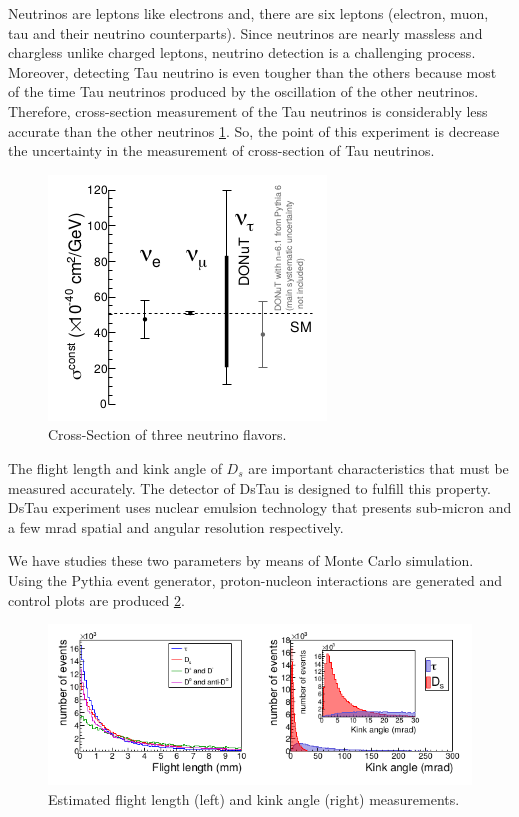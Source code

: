 \documentclass[12pt]{report}
\begin{document}
Neutrinos are leptons like electrons and, there are six leptons (electron, muon, tau and their neutrino counterparts). Since neutrinos are nearly massless and chargless unlike charged leptons, neutrino detection is a challenging process. Moreover, detecting Tau neutrino is even tougher than the others because most of the time Tau neutrinos produced by the oscillation of the other neutrinos. Therefore, cross-section measurement of the Tau neutrinos is considerably less accurate than the other neutrinos \ref{fig:cross}. So, the point of this experiment is decrease the uncertainty in the measurement of cross-section of Tau neutrinos.

\begin{figure}[htp]
\centering
\includegraphics[width = 6 cm]{LeptonCross.png}
\caption{Cross-Section of three neutrino flavors.~\cite[p.~2]{aoki_ariga_dmitrievsky_firu_forshaw_fukuda_gornushkin_guler_haiduc_2019}}
\label{fig:cross}
\end{figure}

The flight length and kink angle of $D_s$ are important characteristics that must be measured accurately. The detector of DsTau is designed to fulfill this property. DsTau experiment uses nuclear emulsion technology that presents sub-micron and a few mrad spatial and angular resolution respectively.

We have studies these two parameters by means of Monte Carlo simulation. Using the Pythia event generator, proton-nucleon interactions are generated and control plots are produced \ref{fig:result}.

\begin{figure}[htp]
\centering
\includegraphics[width = \linewidth]{pythiaOut.png}
\caption{Estimated flight length (left) and kink angle (right) measurements.~\cite[p.~5]{aoki_ariga_dmitrievsky_firu_forshaw_fukuda_gornushkin_guler_haiduc_2019}}
\label{fig:result}
\end{figure}
\end{document}

